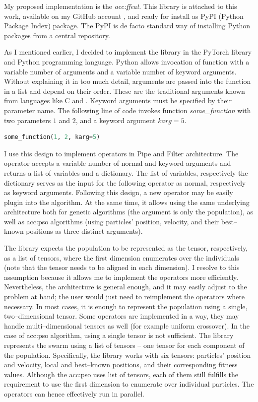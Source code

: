 My proposed implementation is the \emph{\acrfull{acc:ffeat}}. This library is attached to this work, available on my GitHub account \citep{FFEATrepo}, and ready for install as PyPI (Python Package Index) \href{https://pypi.org/project/FFEAT/}{package}. The PyPI is de facto standard way of installing Python packages from a central repository.

As I mentioned earlier, I decided to implement the library in the PyTorch library and Python programming language. Python allows invocation of function with a variable number of arguments and a variable number of keyword arguments. Without explaining it in too much detail, arguments are passed into the function in a list and depend on their order. These are the traditional arguments known from languages like C and \cppns. Keyword arguments must be specified by their parameter name. The following line of code invokes function \textit{some\_function} with two parameters $1$ and $2$, and a keyword argument $karg=5$.

\begin{lstlisting}[language=Python]
some_function(1, 2, karg=5)
\end{lstlisting}

I use this design to implement operators in Pipe and Filter architecture. The operator accepts a variable number of normal and keyword arguments and returns a list of variables and a dictionary. The list of variables, respectively the dictionary serves as the input for the following operator as normal, respectively as keyword arguments. Following this design, a new operator may be easily plugin into the algorithm. At the same time, it allows using the same underlying architecture both for genetic algorithms (the argument is only the population), as well as \acrshort{acc:pso} algorithms (using particles' position, velocity, and their best--known positions as three distinct arguments).

The library expects the population to be represented as the tensor, respectively, as a list of tensors, where the first dimension enumerates over the individuals (note that the tensor needs to be aligned in each dimension). I resolve to this assumption because it allows me to implement the operators more efficiently. Nevertheless, the architecture is general enough, and it may easily adjust to the problem at hand; the user would just need to reimplement the operators where necessary. In most cases, it is enough to represent the population using a single, two--dimensional tensor. Some operators are implemented in a way, they may handle multi--dimensional tensors as well (for example uniform crossover). In the case of \acrshort{acc:pso} algorithm, using a single tensor is not sufficient. The library represents the swarm using a list of tensors -- one tensor for each component of the population. Specifically, the library works with six tensors: particles' position and velocity, local and best--known positions, and their corresponding fitness values. Although the \acrshort{acc:pso} uses list of tensors, each of them still fulfills the requirement to use the first dimension to enumerate over individual particles. The operators can hence effectively run in parallel.

